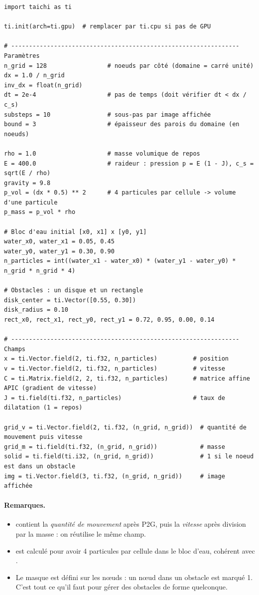 \documentclass[11pt,a4paper]{article}
\newcommand{\code}[1]{\texttt{\detokenize{#1}}}
\begin{document}
\begin{lstlisting}
import taichi as ti

ti.init(arch=ti.gpu)  # remplacer par ti.cpu si pas de GPU

# ---------------------------------------------------------------- Paramètres
n_grid = 128                 # noeuds par côté (domaine = carré unité)
dx = 1.0 / n_grid
inv_dx = float(n_grid)
dt = 2e-4                    # pas de temps (doit vérifier dt < dx / c_s)
substeps = 10                # sous-pas par image affichée
bound = 3                    # épaisseur des parois du domaine (en noeuds)

rho = 1.0                    # masse volumique de repos
E = 400.0                    # raideur : pression p = E (1 - J), c_s = sqrt(E / rho)
gravity = 9.8
p_vol = (dx * 0.5) ** 2      # 4 particules par cellule -> volume d'une particule
p_mass = p_vol * rho

# Bloc d'eau initial [x0, x1] x [y0, y1]
water_x0, water_x1 = 0.05, 0.45
water_y0, water_y1 = 0.30, 0.90
n_particles = int((water_x1 - water_x0) * (water_y1 - water_y0) * n_grid * n_grid * 4)

# Obstacles : un disque et un rectangle
disk_center = ti.Vector([0.55, 0.30])
disk_radius = 0.10
rect_x0, rect_x1, rect_y0, rect_y1 = 0.72, 0.95, 0.00, 0.14

# ---------------------------------------------------------------- Champs
x = ti.Vector.field(2, ti.f32, n_particles)          # position
v = ti.Vector.field(2, ti.f32, n_particles)          # vitesse
C = ti.Matrix.field(2, 2, ti.f32, n_particles)       # matrice affine APIC (gradient de vitesse)
J = ti.field(ti.f32, n_particles)                    # taux de dilatation (1 = repos)

grid_v = ti.Vector.field(2, ti.f32, (n_grid, n_grid))  # quantité de mouvement puis vitesse
grid_m = ti.field(ti.f32, (n_grid, n_grid))            # masse
solid = ti.field(ti.i32, (n_grid, n_grid))             # 1 si le noeud est dans un obstacle
img = ti.Vector.field(3, ti.f32, (n_grid, n_grid))     # image affichée
\end{lstlisting}

\paragraph{Remarques.}
\begin{itemize}
  \item \code{grid_v} contient la \emph{quantité de mouvement} après P2G, puis la \emph{vitesse}
        après division par la masse : on réutilise le même champ.
  \item \code{n_particles} est calculé pour avoir 4 particules par cellule dans le bloc d'eau,
        cohérent avec \code{p_vol}.
  \item Le masque \code{solid} est défini sur les n\oe uds : un n\oe ud dans un obstacle est
        marqué 1. C'est tout ce qu'il faut pour gérer des obstacles de forme quelconque.
\end{itemize}
\end{document}
